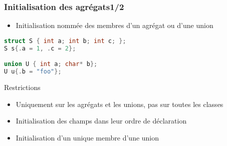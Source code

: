 \documentclass[C++.tex]{subfiles}
\begin{document}
\begin{frame}[fragile]
	\frametitle{Initialisation des agrégats\titlehfill{}1/2}
	\begin{itemize}
		\item Initialisation nommée des membres d'un agrégat ou d'une union
	
	\end{itemize}

	\begin{lstlisting}[language=C++]
struct S { int a; int b; int c; }; 
S s{.a = 1, .c = 2};

union U { int a; char* b};
U u{.b = "foo"}; \end{lstlisting}

	\begin{alertblock}{Restrictions}
		\begin{itemize}
			\item Uniquement sur les agrégats et les unions, pas sur toutes les classes
			\item Initialisation des champs dans leur ordre de déclaration
			\item Initialisation d'un unique membre d'une union

		\end{itemize}
	\end{alertblock}
\end{frame}
\end{document}
